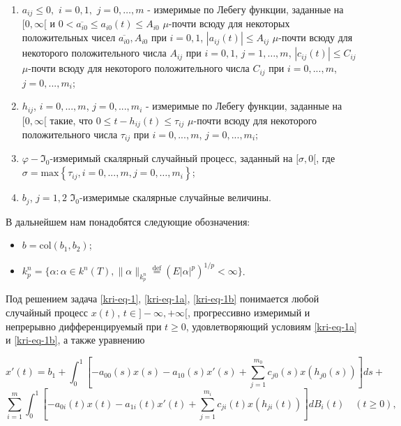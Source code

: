 \begin{enumerate}
	\item[1.]
	$a_{ij}\le 0,$ $i=0,1,$ $j=0,\dots,m$ - измеримые по Лебегу	функции, заданные на $[0,\infty [$ и  $0<\overline{a_{\mathit{i0}}}\le a_{\mathit{i0}}(t)\le A_{\mathit{i0}}$ $\mu$-почти всюду для некоторых положительных чисел $\overline{a_{\mathit{i0}}},A_{\mathit{i0}}$ при $i=0,1$, $|a_{ij}(t)|\le A_{ij}$ $\mu$-почти всюду для некоторого положительного числа  $A_{ij}$ при $i=0,1$, $j=1,\dots,m$, $|c_{ij}(t)|\le C_{ij}$ $\mu$-почти всюду для некоторого положительного числа  $C_{ij}$ при $i=0,...,m$, $j=0,...,m_i$;
	
	\item[2.]
	$h_{ij}$, $i=0,...,m$, $j=0,...,m_i$ - измеримые по Лебегу функции, заданные на $[0,\infty [$ такие, что $0 \le t-h_{ij}(t)\le \tau_{ij}$ $\mu$-почти всюду для некоторого положительного числа  $\tau_{ij}$ при $i=0,...,m$, $j=0,...,m_i$;
	
	\item[3.]
	$\varphi - \Im_0$-измеримый скалярный случайный процесс, заданный на $[\sigma ,0[$, где \linebreak $\sigma =\text{max}\left\{\tau_{ij}, i=0,...,m, j=0,\dots,m_i\right\}$;
	
	\item[4.]
	$b_j$, $j=1,2$ $\Im_0$-измеримые скалярные случайные величины.
\end{enumerate}

В дальнейшем нам понадобятся следующие обозначения:

\begin{itemize}
	\item[-]
	$b=\text{col}(b_1,b_2)$;
	
	\item[-]
	$k_p^n=\{\alpha :\alpha \in k^n(T),\|\alpha \|_{k_p^n}\overset{\text{def}}{=}\left(E|\alpha
	|^p\right)^{1/p}<\infty \}$.
\end{itemize}

Под решением задача \eqref{kri-eq-1}, \eqref{kri-eq-1a}, \eqref{kri-eq-1b} понимается любой случайный процесс $x(t)$, $t\in ]-\infty ,+\infty[$, прогрессивно измеримый и непрерывно дифференцируемый при  $t\ge 0$, удовлетворяющий условиям \eqref{kri-eq-1a} и \eqref{kri-eq-1b}, а также уравнению

\begin{equation}\label{kri-eq-1-1}
	x'(t) = b_1+ \int_{0}^{1} \left[-a_{00}(s)x(s) - a_{10}(s)x'(s) + \sum_{j=1}^{m_0}c_{j0}(s)x(h_{j0}(s))\right]ds +
\end{equation}
\begin{equation*}
	\sum_{i=1}^{m} \int_{0}^{1} \left[-a_{0i}(t)x(t)-a_{1i}(t)x'(t)+\sum_{j=1}^{m_i}c_{ji}(t)x(h_{ji}(t))\right]dB_i(t) \quad (t \ge 0),
\end{equation*}

